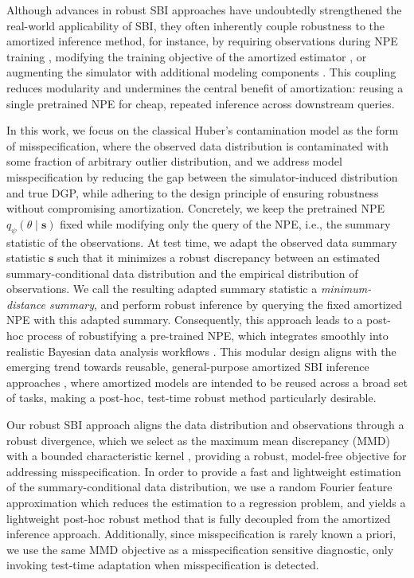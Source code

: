 \documentclass{article}
\theoremstyle{plain}
\theoremstyle{definition}
\theoremstyle{remark}
\begin{document}
 Although advances in robust SBI approaches have undoubtedly strengthened the real-world applicability of SBI, they often inherently couple robustness to the amortized inference method, for instance, by requiring observations during NPE training \citep{huangLearningRobustStatistics2023g}, modifying the training objective of the amortized estimator \citep{gao2023generalized}, or augmenting the simulator with additional modeling components \citep{wardRobustNeuralPosterior2022a}.  
This coupling reduces modularity and undermines the central benefit of amortization: reusing a single pretrained NPE for cheap, repeated inference across downstream queries.


In this work, we focus on the classical Huber's contamination model as the form of misspecification, where the observed data distribution is contaminated with some fraction of arbitrary outlier distribution, and we address model misspecification by reducing the gap between the simulator-induced distribution and true DGP, while adhering to the design principle of ensuring robustness without compromising amortization.
Concretely, we keep the pretrained NPE $q_\psi(\theta \mid \mathbf{s})$ fixed while modifying only the query of the NPE, i.e., the summary statistic of the observations. At test time,  we adapt the observed data summary statistic \( \mathbf{s} \)  such that it minimizes a robust discrepancy between an estimated summary-conditional data distribution and the empirical distribution of observations. 
We call the resulting adapted summary statistic a \emph{minimum-distance summary}, and perform robust inference by querying the fixed amortized NPE with this adapted summary. 
Consequently, this approach leads to a post-hoc process of robustifying a pre-trained NPE, 
which  integrates smoothly into realistic Bayesian data analysis workflows \citep{gelmanBayesianWorkflow2020}.
This modular design aligns with the emerging trend towards reusable, general-purpose amortized SBI inference approaches \citep{vetterEffortlessSimulationEfficientBayesian2025b, gloecklerAllinoneSimulationbasedInference2024f}, where amortized models are intended to be reused across a broad set of tasks, making a post-hoc, test-time robust method particularly desirable.

Our robust SBI approach aligns the data distribution and observations through a robust divergence, which we select as the maximum mean discrepancy (MMD) with a bounded characteristic kernel \citep{grettonKernelTwoSampleTest2012}, providing a robust, model-free objective for addressing misspecification. In order to provide a fast and lightweight estimation of the summary-conditional data distribution, we use a random Fourier feature approximation \citep{rahimiRandomFeaturesLargeScale2007} which reduces the estimation to a regression problem, and yields a lightweight post-hoc robust method that is fully decoupled from the amortized inference approach. Additionally, since misspecification is rarely known a priori, we use the same MMD objective as a misspecification sensitive diagnostic, only invoking test-time adaptation when misspecification is detected.
\end{document}
